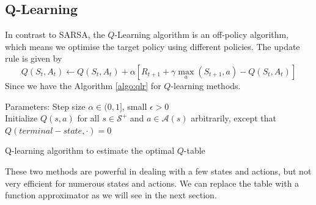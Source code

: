 \subsection{Q-Learning}
In contrast to SARSA, the $Q$-Learning algorithm is an off-policy algorithm, which means we optimise the target policy using different policies. The update rule is given by
\begin{equation}\label{eq:qlr}
	Q(S_t, A_t)\leftarrow Q(S_t, A_t) + \alpha[R_{t+1} + \gamma\max_a (S_{t+1}, a) - Q(S_t, A_t)]
\end{equation}
Since we have the Algorithm \ref{algo:qlr} for $Q$-learning methods.
\begin{algorithm}
	Parameters: Step size $\alpha\in(0,1]$, small $\epsilon>0$\\
	Initialize $Q(s,a)$ for all $s\in\mathcal{S}^{+}$ and $a\in\mathcal{A}(s)$ arbitrarily, except that $Q(terminal-state, \cdot)=0$\\
	\caption{Q-learning algorithm to estimate the optimal $Q$-table}
	\label{algo:qlr}
\end{algorithm}



These two methods are powerful in dealing with a few states and actions, but not very efficient for numerous states and actions. We can replace the table with a function approximator as we will see in the next section.



